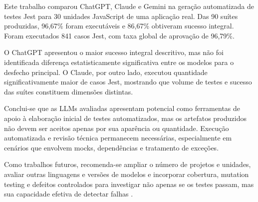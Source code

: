 \documentclass[12pt]{article}
\begin{document}
Este trabalho comparou ChatGPT, Claude e Gemini na geração automatizada de testes Jest para 30 unidades JavaScript de uma aplicação real. Das 90 suítes produzidas, 96,67\% foram executáveis e 86,67\% obtiveram sucesso integral. Foram executados 841 casos Jest, com taxa global de aprovação de 96,79\%.

O ChatGPT apresentou o maior sucesso integral descritivo, mas não foi identificada diferença estatisticamente significativa entre os modelos para o desfecho principal. O Claude, por outro lado, executou quantidade significativamente maior de casos Jest, mostrando que volume de testes e sucesso das suítes constituem dimensões distintas.

Conclui-se que as LLMs avaliadas apresentam potencial como ferramentas de apoio à elaboração inicial de testes automatizados, mas os artefatos produzidos não devem ser aceitos apenas por sua aparência ou quantidade. Execução automatizada e revisão técnica permanecem necessárias, especialmente em cenários que envolvem mocks, dependências e tratamento de exceções.

Como trabalhos futuros, recomenda-se ampliar o número de projetos e unidades, avaliar outras linguagens e versões de modelos e incorporar cobertura, mutation testing e defeitos controlados para investigar não apenas se os testes passam, mas sua capacidade efetiva de detectar falhas \cite{dakhel2024mutap}.



\end{document}
